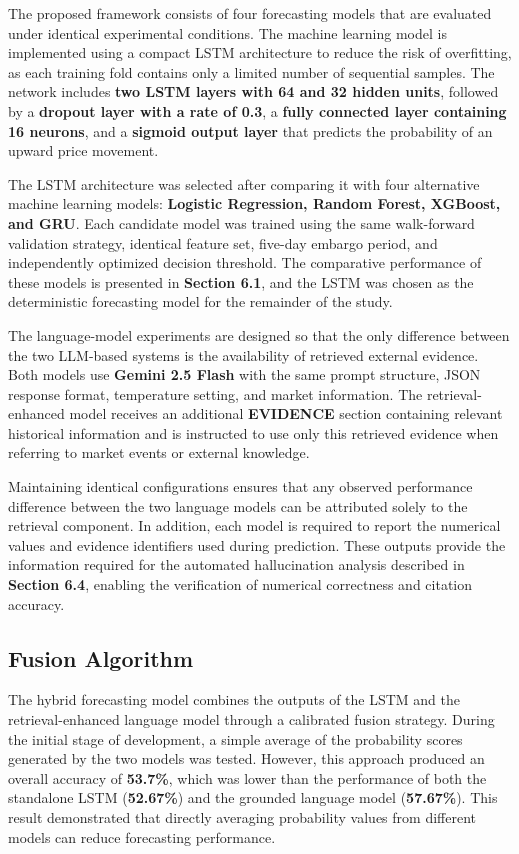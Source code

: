 The proposed framework consists of four forecasting models that are
evaluated under identical experimental conditions. The machine learning
model is implemented using a compact LSTM architecture to reduce the
risk of overfitting, as each training fold contains only a limited
number of sequential samples. The network includes \textbf{two LSTM
layers with 64 and 32 hidden units}, followed by a \textbf{dropout layer
with a rate of 0.3}, a \textbf{fully connected layer containing 16
neurons}, and a \textbf{sigmoid output layer} that predicts the
probability of an upward price movement.

The LSTM architecture was selected after comparing it with four
alternative machine learning models: \textbf{Logistic Regression, Random
Forest, XGBoost, and GRU}. Each candidate model was trained using the
same walk-forward validation strategy, identical feature set, five-day
embargo period, and independently optimized decision threshold. The
comparative performance of these models is presented in \textbf{Section
6.1}, and the LSTM was chosen as the deterministic forecasting model for
the remainder of the study.

The language-model experiments are designed so that the only difference
between the two LLM-based systems is the availability of retrieved
external evidence. Both models use \textbf{Gemini 2.5 Flash} with the
same prompt structure, JSON response format, temperature setting, and
market information. The retrieval-enhanced model receives an additional
\textbf{EVIDENCE} section containing relevant historical information and
is instructed to use only this retrieved evidence when referring to
market events or external knowledge.

Maintaining identical configurations ensures that any observed
performance difference between the two language models can be attributed
solely to the retrieval component. In addition, each model is required
to report the numerical values and evidence identifiers used during
prediction. These outputs provide the information required for the
automated hallucination analysis described in \textbf{Section 6.4},
enabling the verification of numerical correctness and citation
accuracy.

\subsection{Fusion Algorithm}\label{sec:fusion-algorithm}

The hybrid forecasting model combines the outputs of the LSTM and the
retrieval-enhanced language model through a calibrated fusion strategy.
During the initial stage of development, a simple average of the
probability scores generated by the two models was tested. However, this
approach produced an overall accuracy of \textbf{53.7\%}, which was
lower than the performance of both the standalone LSTM
(\textbf{52.67\%}) and the grounded language model (\textbf{57.67\%}).
This result demonstrated that directly averaging probability values from
different models can reduce forecasting performance.

